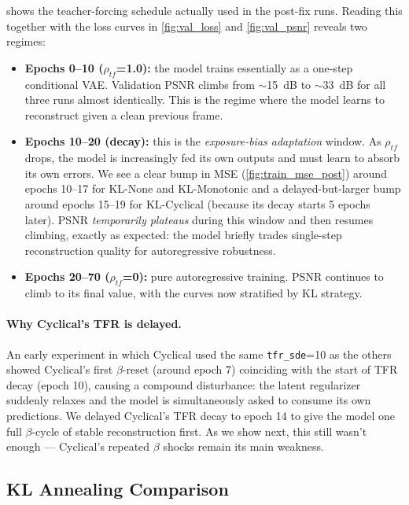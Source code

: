 \documentclass[10pt,twocolumn,letterpaper]{article}
\begin{document}
 shows the teacher-forcing schedule actually used in the post-fix runs. Reading this together with the loss curves in \cref{fig:val_loss} and \cref{fig:val_psnr} reveals two regimes:

\begin{itemize}
    \item \textbf{Epochs 0--10 ($\rho_{tf}$=1.0):} the model trains essentially as a one-step conditional VAE. Validation PSNR climbs from $\sim$15~dB to $\sim$33~dB for all three runs almost identically. This is the regime where the model learns to reconstruct given a clean previous frame.
    \item \textbf{Epochs 10--20 (decay):} this is the \emph{exposure-bias adaptation} window. As $\rho_{tf}$ drops, the model is increasingly fed its own outputs and must learn to absorb its own errors. We see a clear bump in MSE (\cref{fig:train_mse_post}) around epochs 10--17 for KL-None and KL-Monotonic and a delayed-but-larger bump around epochs 15--19 for KL-Cyclical (because its decay starts 5 epochs later). PSNR \emph{temporarily plateaus} during this window and then resumes climbing, exactly as expected: the model briefly trades single-step reconstruction quality for autoregressive robustness.
    \item \textbf{Epochs 20--70 ($\rho_{tf}$=0):} pure autoregressive training. PSNR continues to climb to its final value, with the curves now stratified by KL strategy.
\end{itemize}

\paragraph{Why Cyclical's TFR is delayed.} An early experiment in which Cyclical used the same \texttt{tfr\_sde}=10 as the others showed Cyclical's first $\beta$-reset (around epoch 7) coinciding with the start of TFR decay (epoch 10), causing a compound disturbance: the latent regularizer suddenly relaxes and the model is simultaneously asked to consume its own predictions. We delayed Cyclical's TFR decay to epoch 14 to give the model one full $\beta$-cycle of stable reconstruction first. As we show next, this still wasn't enough --- Cyclical's repeated $\beta$ shocks remain its main weakness.

\subsection{KL Annealing Comparison}
\label{sec:kl}
\end{document}

